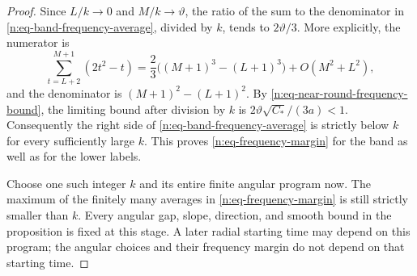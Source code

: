 \begin{proof}
Since \(L/k\to0\) and \(M/k\to\vartheta\), the ratio of the sum to
the denominator in \eqref{n:eq-band-frequency-average}, divided by
\(k\), tends to \(2\vartheta/3\).  More explicitly, the numerator is
\[
 \sum_{t=L+2}^{M+1}(2t^2-t)
 =\frac23\bigl((M+1)^3-(L+1)^3\bigr)+O(M^2+L^2),
\]
and the denominator is \((M+1)^2-(L+1)^2\).  By
\eqref{n:eq-near-round-frequency-bound}, the limiting bound after
division by \(k\) is \(2\vartheta\sqrt{C_*}/(3a)<1\).
Consequently the right side of
\eqref{n:eq-band-frequency-average} is strictly below \(k\) for
every sufficiently large \(k\).  This proves
\eqref{n:eq-frequency-margin} for the band as well as for the
lower labels.

Choose one such integer \(k\) and its entire finite angular program
now.  The maximum of the finitely many averages in
\eqref{n:eq-frequency-margin} is still strictly smaller than \(k\).
Every angular gap, slope, direction, and smooth bound in the
proposition is fixed at this stage.  A later radial starting time
may depend on this program; the angular choices and their frequency
margin do not depend on that starting time.
\end{proof}
